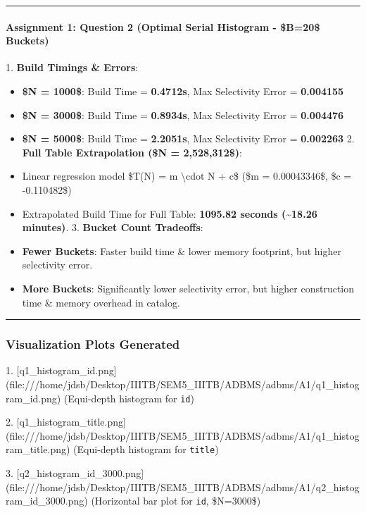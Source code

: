 \documentclass[11pt,a4paper]{article}
\begin{document}
{\hrule


\paragraph{\textbf{Assignment 1: Question 2 (Optimal Serial Histogram - \$B=20\$ Buckets)}}
1. \textbf{Build Timings \& Errors}:

\begin{itemize}
\item \textbf{\$N = 1000\$}: Build Time = \textbf{0.4712s}, Max Selectivity Error = \textbf{0.004155}
\item \textbf{\$N = 3000\$}: Build Time = \textbf{0.8934s}, Max Selectivity Error = \textbf{0.004476}
\item \textbf{\$N = 5000\$}: Build Time = \textbf{2.2051s}, Max Selectivity Error = \textbf{0.002263}
2. \textbf{Full Table Extrapolation (\$N = 2,528,312\$)}:

\item Linear regression model \$T(N) = m \textbackslash{}cdot N + c\$ (\$m = 0.00043346\$, \$c = -0.110482\$)
\item Extrapolated Build Time for Full Table: \textbf{1095.82 seconds (\textasciitilde{}18.26 minutes)}.
3. \textbf{Bucket Count Tradeoffs}:

\item \textbf{Fewer Buckets}: Faster build time \& lower memory footprint, but higher selectivity error.
\item \textbf{More Buckets}: Significantly lower selectivity error, but higher construction time \& memory overhead in catalog.
\end{itemize}

\hrule


\subsubsection{Visualization Plots Generated}

1. [q1\_histogram\_id.png](file:///home/jdsb/Desktop/IIITB/SEM5\_IIITB/ADBMS/adbms/A1/q1\_histogram\_id.png) (Equi-depth histogram for \texttt{id})

2. [q1\_histogram\_title.png](file:///home/jdsb/Desktop/IIITB/SEM5\_IIITB/ADBMS/adbms/A1/q1\_histogram\_title.png) (Equi-depth histogram for \texttt{title})

3. [q2\_histogram\_id\_3000.png](file:///home/jdsb/Desktop/IIITB/SEM5\_IIITB/ADBMS/adbms/A1/q2\_histogram\_id\_3000.png) (Horizontal bar plot for \texttt{id}, \$N=3000\$)

}
\end{document}
